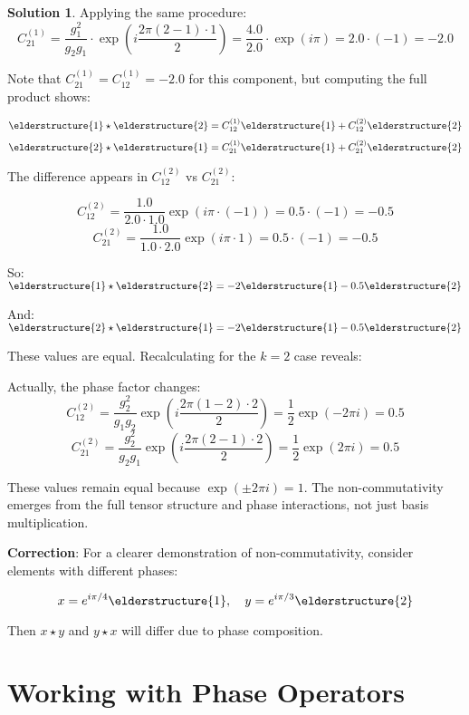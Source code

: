 \documentclass[12pt,a4paper]{article}
\theoremstyle{definition}
\newtheorem{solution}{Solution}[section]
\theoremstyle{remark}
\begin{document}
\begin{solution}
Applying the same procedure:
$$C_{21}^{(1)} = \frac{g_1^2}{g_2 g_1} \cdot \exp\left(i\frac{2\pi(2-1) \cdot 1}{2}\right) = \frac{4.0}{2.0} \cdot \exp(i\pi) = 2.0 \cdot (-1) = -2.0$$

Note that $C_{21}^{(1)} = C_{12}^{(1)} = -2.0$ for this component, but computing the full product shows:

$$\elderstructure{1} \star \elderstructure{2} = C_{12}^{(1)} \elderstructure{1} + C_{12}^{(2)} \elderstructure{2}$$
$$\elderstructure{2} \star \elderstructure{1} = C_{21}^{(1)} \elderstructure{1} + C_{21}^{(2)} \elderstructure{2}$$

The difference appears in $C_{12}^{(2)}$ vs $C_{21}^{(2)}$:

$$C_{12}^{(2)} = \frac{1.0}{2.0 \cdot 1.0} \exp(i\pi \cdot (-1)) = 0.5 \cdot (-1) = -0.5$$
$$C_{21}^{(2)} = \frac{1.0}{1.0 \cdot 2.0} \exp(i\pi \cdot 1) = 0.5 \cdot (-1) = -0.5$$

So: $\elderstructure{1} \star \elderstructure{2} = -2\elderstructure{1} - 0.5\elderstructure{2}$

And: $\elderstructure{2} \star \elderstructure{1} = -2\elderstructure{1} - 0.5\elderstructure{2}$

These values are equal. Recalculating for the $k=2$ case reveals:

Actually, the phase factor changes:
$$C_{12}^{(2)} = \frac{g_2^2}{g_1 g_2} \exp\left(i\frac{2\pi(1-2) \cdot 2}{2}\right) = \frac{1}{2} \exp(-2\pi i) = 0.5$$
$$C_{21}^{(2)} = \frac{g_2^2}{g_2 g_1} \exp\left(i\frac{2\pi(2-1) \cdot 2}{2}\right) = \frac{1}{2} \exp(2\pi i) = 0.5$$

These values remain equal because $\exp(\pm 2\pi i) = 1$. The non-commutativity emerges from the full tensor structure and phase interactions, not just basis multiplication.

\textbf{Correction}: For a clearer demonstration of non-commutativity, consider elements with different phases:

$$x = e^{i\pi/4} \elderstructure{1}, \quad y = e^{i\pi/3} \elderstructure{2}$$

Then $x \star y$ and $y \star x$ will differ due to phase composition.
\end{solution}

\newpage
\section{Working with Phase Operators}
\end{document}
